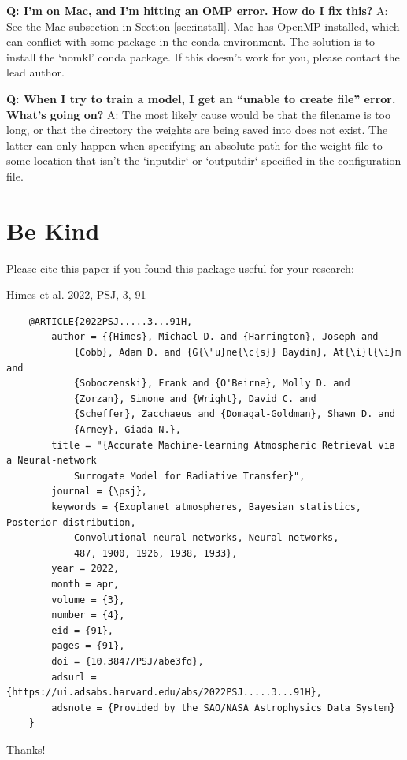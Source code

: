 \documentclass[letterpaper, 12pt]{article}
\begin{document}

\noindent \textbf{Q: I'm on Mac, and I'm hitting an OMP error.  How do 
I fix this?}  A: See the Mac subsection in Section \ref{sec:install}.  Mac has 
OpenMP installed, which can conflict with some package in the conda 
environment.  The solution is to install the `nomkl' conda package.  
If this doesn't work for you, please contact the lead author.  \newline

\noindent \textbf{Q: When I try to train a model, I get an ``unable to create 
file'' error.  What's going on?}  A: The most likely cause would be that the 
filename is too long, or that the directory the weights are being saved into 
does not exist.  The latter can only happen when specifying an absolute path 
for the weight file to some location that isn't the `inputdir` or `outputdir` 
specified in the configuration file.


\section{Be Kind}
\label{sec:bekind}
Please cite this paper if you found this package useful for your research:

\href{https://iopscience.iop.org/article/10.3847/PSJ/abe3fd/meta}{Himes et al. 2022, PSJ, 3, 91}

\begin{verbatim}
	@ARTICLE{2022PSJ.....3...91H,
		author = {{Himes}, Michael D. and {Harrington}, Joseph and 
			{Cobb}, Adam D. and {G{\"u}ne{\c{s}} Baydin}, At{\i}l{\i}m and 
			{Soboczenski}, Frank and {O'Beirne}, Molly D. and 
			{Zorzan}, Simone and {Wright}, David C. and 
			{Scheffer}, Zacchaeus and {Domagal-Goldman}, Shawn D. and 
			{Arney}, Giada N.},
		title = "{Accurate Machine-learning Atmospheric Retrieval via a Neural-network 
			Surrogate Model for Radiative Transfer}",
		journal = {\psj},
		keywords = {Exoplanet atmospheres, Bayesian statistics, Posterior distribution, 
			Convolutional neural networks, Neural networks, 
			487, 1900, 1926, 1938, 1933},
		year = 2022,
		month = apr,
		volume = {3},
		number = {4},
		eid = {91},
		pages = {91},
		doi = {10.3847/PSJ/abe3fd},
		adsurl = {https://ui.adsabs.harvard.edu/abs/2022PSJ.....3...91H},
		adsnote = {Provided by the SAO/NASA Astrophysics Data System}
	}
\end{verbatim}

\noindent Thanks!



\end{document}
